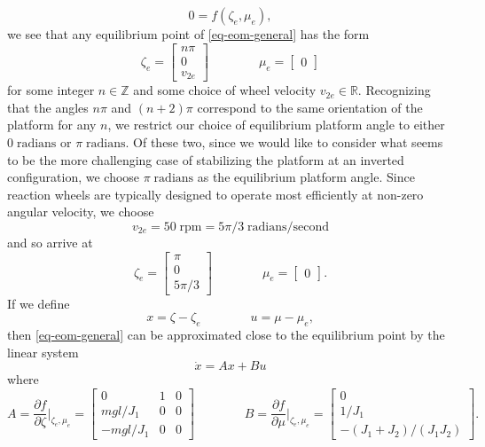 \documentclass[conf]{new-aiaa}
\begin{document}
\begin{equation}
0 = f(\zeta_{e}, \mu_{e}),
\end{equation}
we see that any equilibrium point of \eqref{eq-eom-general} has the form
\begin{equation}
\zeta_{e} = \begin{bmatrix} n\pi \\ 0 \\ v_{2e} \end{bmatrix}
\qquad\qquad
\mu_{e} = \begin{bmatrix} 0 \end{bmatrix}
\end{equation}
for some integer $n \in \mathbb{Z}$ and some choice of wheel velocity $v_{2e} \in \mathbb{R}$. Recognizing that the angles $n\pi$ and $(n+2)\pi$ correspond to the same orientation of the platform for any $n$, we restrict our choice of equilibrium platform angle to either $0\;\text{radians}$ or $\pi\;\text{radians}$. Of these two, since we would like to consider what seems to be the more challenging case of stabilizing the platform at an inverted configuration, we choose $\pi\;\text{radians}$ as the equilibrium platform angle. Since reaction wheels are typically designed to operate most efficiently at non-zero angular velocity, we choose
\begin{equation}
v_{2e} = 50\;\text{rpm} = 5\pi/3\;\text{radians}/\text{second}
\end{equation}
and so arrive at
\begin{equation}
\zeta_{e} = \begin{bmatrix} \pi \\ 0 \\ 5\pi/3 \end{bmatrix}
\qquad\qquad
\mu_{e} = \begin{bmatrix} 0 \end{bmatrix}.
\end{equation}
If we define
\begin{equation}
x = \zeta - \zeta_{e}
\qquad\qquad
u = \mu - \mu_{e},
\end{equation}
then \eqref{eq-eom-general} can be approximated close to the equilibrium point by the linear system
\begin{equation}
\dot{x} = Ax+Bu
\label{eq-ss}
\end{equation}
where
\begin{equation}
A
= \frac{\partial f}{\partial \zeta}\biggr\rvert_{\zeta_{e}, \mu_{e}}
= \begin{bmatrix} 0 & 1 & 0 \\ mgl/J_{1} & 0 & 0 \\ -mgl/J_{1} & 0 & 0 \end{bmatrix}
\qquad\qquad
B
= \frac{\partial f}{\partial \mu}\biggr\rvert_{\zeta_{e}, \mu_{e}}
= \begin{bmatrix} 0 \\ 1/J_{1} \\ -(J_{1} + J_{2}) / (J_{1}J_{2}) \end{bmatrix}.
\end{equation}
\end{document}
